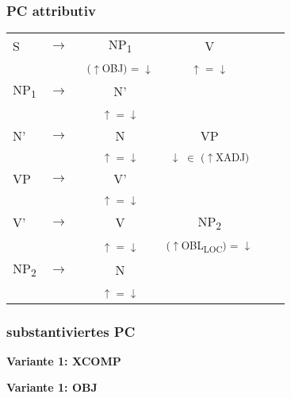 \documentclass[12pt,a4paper]{article}
\begin{document}
\subsubsection{PC attributiv}


\begin{singlespace}
\begin{tabular}{ l  l  c  c  c  c }
  S & $\rightarrow$ & NP\textsubscript{1} & V\\
   & $\qquad$ & \textsuperscript{($\uparrow$OBJ) = $\downarrow$} & \textsuperscript{$\uparrow$ = $\downarrow$} \\
    NP\textsubscript{1} & $\rightarrow$ & N' \\
   & $\qquad$ & \textsuperscript{$\uparrow$ = $\downarrow$} \\
       N' & $\rightarrow$ & N & VP \\
   & $\qquad$ & \textsuperscript{$\uparrow$ = $\downarrow$} & \textsuperscript{$\downarrow$ $\in$ ($\uparrow$XADJ)} \\
		    VP & $\rightarrow$ & V' \\
   & $\qquad$ & \textsuperscript{$\uparrow$ = $\downarrow$} \\
  				  V' & $\rightarrow$ & V & NP\textsubscript{2} \\
   & $\qquad$ & \textsuperscript{$\uparrow$ = $\downarrow$} & \textsuperscript{($\uparrow$OBL\textsubscript{LOC}) = $\downarrow$ }  \\
   					 NP\textsubscript{2} & $\rightarrow$ & N \\
   & $\qquad$ & \textsuperscript{$\uparrow$ = $\downarrow$} \\
\end{tabular} 
\end{singlespace}

\subsubsection{substantiviertes PC}
\textbf{Variante 1: XCOMP}


\textbf{Variante 1: OBJ}
\end{document}
